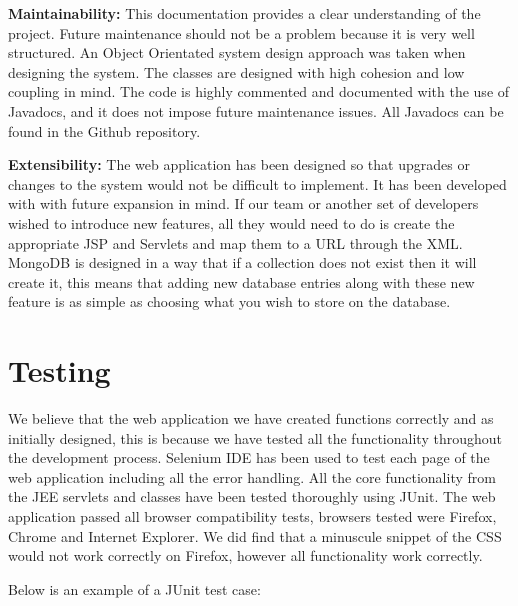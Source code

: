 \par \textbf{Maintainability:} This documentation provides a clear understanding of
the project. Future maintenance should not be a problem because it is very well structured. An Object Orientated system design approach was taken when designing the system. The classes are designed with high cohesion and low coupling in mind. The code
is highly commented and documented with the use of Javadocs, and it does not impose future maintenance issues. All Javadocs can be found in the Github repository.

\par \textbf{Extensibility:} The web application has been designed so that upgrades or changes to the system would not be difficult to implement. It has been developed with with future expansion in mind. If our team or another set of developers wished to introduce new features, all they would need to do is create the appropriate JSP and Servlets and map them to a URL through the XML. MongoDB is designed in a way that if a collection does not exist then it will create it, this means that adding new database entries along with these new feature is as simple as choosing what you wish to store on the database.

\section{Testing}
We believe that the web application we have created functions correctly and as initially designed, this is because we have tested all the functionality throughout the development process. Selenium IDE has been used to test each page of the web application including all the error handling. All the core functionality from the JEE servlets and classes have been tested thoroughly using JUnit. The web application passed all browser compatibility tests, browsers tested were Firefox, Chrome and Internet Explorer. We did find that a minuscule snippet of the CSS would not work correctly on Firefox, however all functionality work correctly.

\par Below is an example of a JUnit test case:

